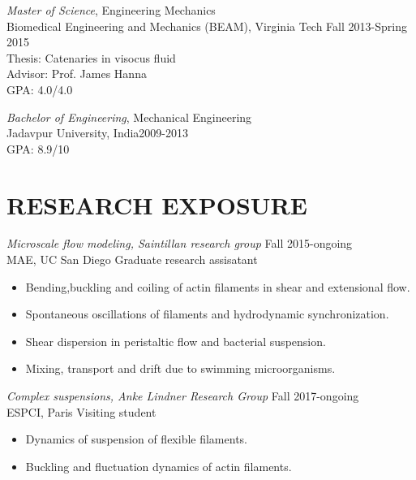 \documentclass[10pt]{res} %
\begin{document}
\begin{resume}
{\sl Master of Science}, Engineering Mechanics \\ 
Biomedical Engineering and Mechanics (BEAM), Virginia Tech \hfill Fall 2013-Spring 2015 \\
Thesis: Catenaries in visocus fluid \\
Advisor: Prof. James Hanna \\
GPA: 4.0/4.0

{\sl Bachelor of Engineering}, Mechanical Engineering \\ 
Jadavpur University, India\hfill 2009-2013 \\
GPA: 8.9/10 


 



\section{{RESEARCH EXPOSURE}} 

\vspace{8pt} %

{\sl Microscale flow modeling, Saintillan research group} \hfill Fall 2015-ongoing \\
MAE, UC San Diego \hfill Graduate research assisatant
\vspace{2mm}
\begin{itemize} \itemsep -2pt %
\item Bending,buckling and coiling of actin filaments in shear and extensional flow.
\item Spontaneous oscillations of filaments and hydrodynamic synchronization.
\item Shear dispersion in peristaltic flow and bacterial suspension.
\item Mixing, transport and drift due to swimming microorganisms.
\end{itemize}

{\sl Complex suspensions, Anke Lindner Research Group} \hfill Fall 2017-ongoing \\
ESPCI, Paris \hfill Visiting student
\vspace{2mm}
\begin{itemize} \itemsep -2pt %
	\item Dynamics of suspension of flexible filaments.
	\item Buckling and fluctuation dynamics of actin filaments.
\end{itemize}


\end{resume}
\end{document}
